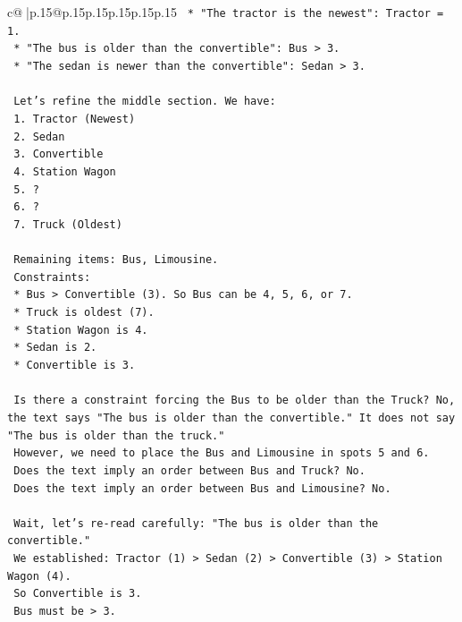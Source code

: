 \documentclass{article}
\begin{document}
{\begin{supertabular}{c@{$\;$}|p{.15\linewidth}@{}p{.15\linewidth}p{.15\linewidth}p{.15\linewidth}p{.15\linewidth}p{.15\linewidth}}
{{{\texttt{    *   "The tractor is the newest": Tractor = 1.} \\
\texttt{    *   "The bus is older than the convertible": Bus > 3.} \\
\texttt{    *   "The sedan is newer than the convertible": Sedan > 3.} \\
\\ 
\texttt{    Let's refine the middle section. We have:} \\
\texttt{    1. Tractor (Newest)} \\
\texttt{    2. Sedan} \\
\texttt{    3. Convertible} \\
\texttt{    4. Station Wagon} \\
\texttt{    5. ?} \\
\texttt{    6. ?} \\
\texttt{    7. Truck (Oldest)} \\
\\ 
\texttt{    Remaining items: Bus, Limousine.} \\
\texttt{    Constraints:} \\
\texttt{    *   Bus > Convertible (3). So Bus can be 4, 5, 6, or 7.} \\
\texttt{    *   Truck is oldest (7).} \\
\texttt{    *   Station Wagon is 4.} \\
\texttt{    *   Sedan is 2.} \\
\texttt{    *   Convertible is 3.} \\
\\ 
\texttt{    Is there a constraint forcing the Bus to be older than the Truck? No, the text says "The bus is older than the convertible." It does not say "The bus is older than the truck."} \\
\texttt{    However, we need to place the Bus and Limousine in spots 5 and 6.} \\
\texttt{    Does the text imply an order between Bus and Truck? No.} \\
\texttt{    Does the text imply an order between Bus and Limousine? No.} \\
\\ 
\texttt{    Wait, let's re{-}read carefully: "The bus is older than the convertible."} \\
\texttt{    We established: Tractor (1) > Sedan (2) > Convertible (3) > Station Wagon (4).} \\
\texttt{    So Convertible is 3.} \\
\texttt{    Bus must be > 3.} \\
}}}
\end{supertabular}}
\end{document}

